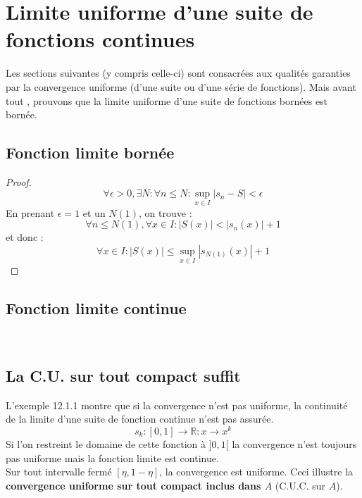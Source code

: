 \documentclass[11pt, a4paper, openany]{book}
\begin{document}
							
							
							
							
							
							
		\section{Limite uniforme d'une suite de fonctions continues}
		Les sections suivantes (y compris celle-ci) sont consacrées aux qualités garanties par la convergence uniforme (d'une suite ou d'une série de fonctions). Mais avant tout , prouvons que la limite uniforme d'une suite de fonctions bornées est bornée.  
		\setcounter{subsection}{-1}
		\subsection{Fonction limite bornée}
		\begin{proof}
			\begin{equation}
				\forall \epsilon > 0, \exists N : \forall n \leq N : \sup\limits_{x \in I} |s_n - S| < \epsilon
			\end{equation}
			En prenant $\epsilon = 1$ et un $N(1)$, on trouve :
			\begin{equation}
				\forall n \leq N(1), \forall x \in I : |S(x)| < |s_n(x)|+1
			\end{equation}
			et donc :
			\begin{equation}
				\forall x \in I : |S(x)| \leq \sup\limits_{x \in I} |s_{N(1)}(x)|+1
			\end{equation}
		\end{proof}
							
							
							
		\subsection{Fonction limite continue}
		\ \\
							
		\subsection{La C.U. sur tout compact suffit}
		L'exemple 12.1.1 montre que si la convergence n'est pas uniforme, la continuité de la limite d'une suite de fonction continue n'est pas assurée. 
		\begin{equation}
			s_k : [0,1] \rightarrow \mathbb{R} : x \rightarrow x^k
		\end{equation}
		Si l'on restreint le domaine de cette fonction à $]0,1[$ la convergence n'est toujours pas uniforme mais la fonction limite est continue.\\
		Sur tout intervalle fermé $[\eta, 1-\eta]$, la convergence est uniforme. Ceci illustre la \textbf{convergence uniforme sur tout compact inclus dans $A$} (C.U.C. sur $A$).
							
\end{document}
